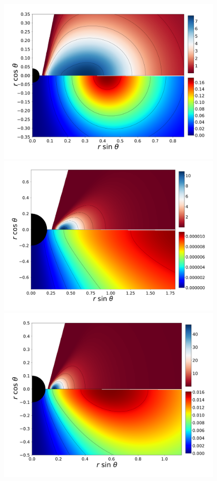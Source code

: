 \documentclass[twocolumn,aps,showpacs,showkeys,prd,superscriptaddress,byrevtex, amsmath]{revtex4-1}
\begin{document}
\begin{figure}
\hspace{-0.3cm}
\includegraphics[scale=0.1267]{figures/fig5_VII_10.pdf}
\hspace{-0.2cm}
\\
\includegraphics[scale=0.1267]{figures/fig5_I__10.pdf}
\hspace{-0.3cm}
\includegraphics[scale=0.12]{figures/fig5_IV__10.pdf}

\end{figure}
\end{document}
